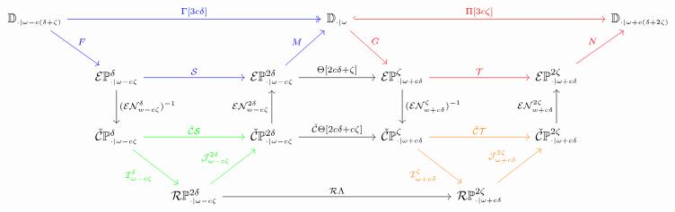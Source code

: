 \begin{scriptsize}
\begin{centering}
\[\begin{tikzcd}[row sep=large, column sep=scriptsize]
  |[alias=U]| \DD{\omega-c(\delta+\zeta)}
                                  \arrow[to=V, two heads, blue, "\Gamma{[3c\delta]}"]
                                  \arrow[to=Sa,blue, "F"]
  &&&& |[alias=V]| \DD{\omega}
                                  \arrow[to=W, hook,red, "\Pi{[3c\zeta]}"]
                                  \arrow[to=Ta,red, "G"]
  &&&& |[alias=W]|
  \DD{\omega+c(\delta+2\zeta)}\\
  & |[alias=Sa]|
  \E\PP{\omega-c\zeta}{\delta}
                                  \arrow[to=Sb, blue, "\mathcal{S}"]
                                  \arrow[to=CSa, "(\E\N_{w-c\zeta}^\delta)^{-1}"]
  && |[alias=Sb]| \E\PP{\omega-c\zeta}{2\delta}
                                  \arrow[to=Ta, "\Theta{[2c\delta+\zeta]}"]
                                  \arrow[to=V, blue, "M"]
  && |[alias=Ta]| \E\PP{\omega+c\delta}{\zeta}
                                  \arrow[to=Tb, red, "\mathcal{T}"]
                                  \arrow[to=CTa, "(\E\N_{w+c\delta}^\zeta)^{-1}"]
  && |[alias=Tb]| \E\PP{\omega+c\delta}{2\zeta}
                                  \arrow[to=W, red, "N"]
  &\\
  & |[alias=CSa]|
  \CPP{\omega-c\zeta}{\delta}
                                  \arrow[to=CSb, green, "\cech\mathcal{S}"]
                                  \arrow[to=RS, green, "\I_{\omega-c\zeta}^\delta"']
  && |[alias=CSb]| \CPP{\omega-c\zeta}{2\delta}
                                  \arrow[to=Sb, "\E\N_{w-c\zeta}^{2\delta}"]
                                  \arrow[to=CTa, "\cech\Theta{[2c\delta+c\zeta]}"]
  && |[alias=CTa]| \CPP{\omega+c\delta}{\zeta}
                                  \arrow[to=CTb, orange, "\cech\mathcal{T}"]
                                  \arrow[to=RT, orange, "\I_{\omega+c\delta}^\zeta"']
  && |[alias=CTb]| \CPP{\omega+c\delta}{2\zeta}
                                  \arrow[to=Tb, "\E\N_{w+c\delta}^{2\zeta}"]
  &\\
  && |[alias=RS]| \RPP{\omega-c\zeta}{2\delta}
                                  \arrow[to=CSb, green, "\J_{\omega-c\zeta}^{2\delta}"]
                                  \arrow[to=RT, "\rips\Lambda"]
  &&&& |[alias=RT]| \RPP{\omega+c\delta}{2\zeta}
                                  \arrow[to=CTb, orange, "\J_{\omega+c\delta}^{2\zeta}"]
  &&\\
\end{tikzcd}\]
\end{centering}
\end{scriptsize}

